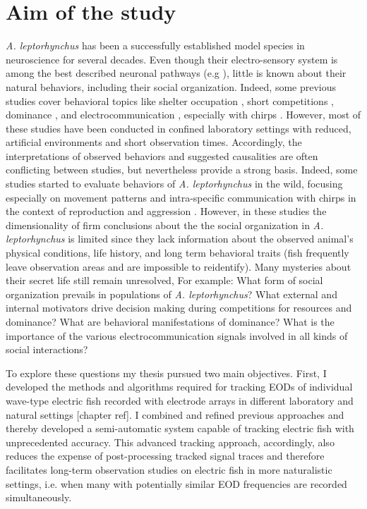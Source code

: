 \documentclass[11pt,pdftex]{article}
\newcommand{\note}[2][]{\textcolor{red!80!black}{[\textbf{\ifthenelse{\equal{#1}{}}{}{#1: }}#2]}}
\newcommand{\notetr}[1]{\note[TR]{#1}}
\newcommand{\lepto}{\textit{A. leptorhynchus}}
\begin{document}
\section{Aim of the study}

\lepto{} has been a successfully established model species in neuroscience for several decades. Even though their electro-sensory system is among the best described neuronal pathways (e.g \citealp{Benda2005, Bullock2006, Sinz2020}), little is known about their natural behaviors, including their social organization. Indeed, some previous studies cover behavioral topics like shelter occupation \citep{Dunlap2002, Stamper2010}, short competitions \citep{Hupe2008, Triefenbach2008}, dominance \citep{Dunlap2002}, and electrocommunication \citep{Smith2013, Henninger2018}, especially with chirps \citep{Engler2000}. However, most of these studies have been conducted in confined laboratory settings with reduced, artificial environments and short observation times. Accordingly, the interpretations of observed behaviors and suggested causalities are often conflicting between studies, but nevertheless provide a strong basis. Indeed, some studies started to evaluate behaviors of \lepto{} in the wild, focusing especially on movement patterns and intra-specific communication with chirps in the context of reproduction and aggression \citep{Henninger2018, Henninger2020}. However, in these studies the dimensionality of firm conclusions about the the social organization in \lepto{} is limited since they lack information about the observed animal's physical conditions, life history, and long term behavioral traits (fish frequently leave observation areas and are impossible to reidentify). Many mysteries about their secret life still remain unresolved, For example: What form of social organization prevails in populations of \lepto{}? What external and internal motivators drive decision making during competitions for resources and dominance? What are behavioral manifestations of dominance? What is the importance of the various electrocommunication signals involved in all kinds of social interactions?    

To explore these questions my thesis pursued two main objectives. First, I developed the methods and algorithms required for tracking EODs of individual wave-type electric fish recorded with electrode arrays in different laboratory and natural settings \notetr{chapter ref}. I combined and refined previous approaches \citep{Madhav2018, Henninger2020} and thereby developed a semi-automatic system capable of tracking electric fish with unprecedented accuracy. This advanced tracking approach, accordingly, also reduces the expense of post-processing tracked signal traces and therefore facilitates long-term observation studies on electric fish in more naturalistic settings, i.e. when many with potentially similar EOD frequencies are recorded simultaneously.
\end{document}
